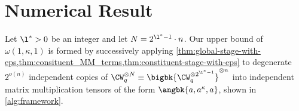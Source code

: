 \newcommand{\numgrow}{V}
\newcommand{\numgrowl}[1][\l]{\numgrow_{#1}}
\newcommand{\interl}[1][\l]{\T_{#1}}

\section{Numerical Result}
\label{sec:numerical}

Let $\l^* > 0$ be an integer and let $N = 2^{\l^* - 1} \cdot n$. Our upper bound of $\omega(1, \kappa, 1)$ is formed by successively applying \cref{thm:global-stage-with-eps,thm:consituent_MM_terms,thm:constituent-stage-with-eps} to degenerate $2^{o(n)}$ independent copies of $\CW_q^{\otimes N} \equiv \bigbk{\CW_q^{\otimes 2^{\l^* - 1}}}^{\otimes n}$ into independent matrix multiplication tensors of the form $\angbk{a, a^{\kappa}, a}$, shown in \cref{alg:framework}.

